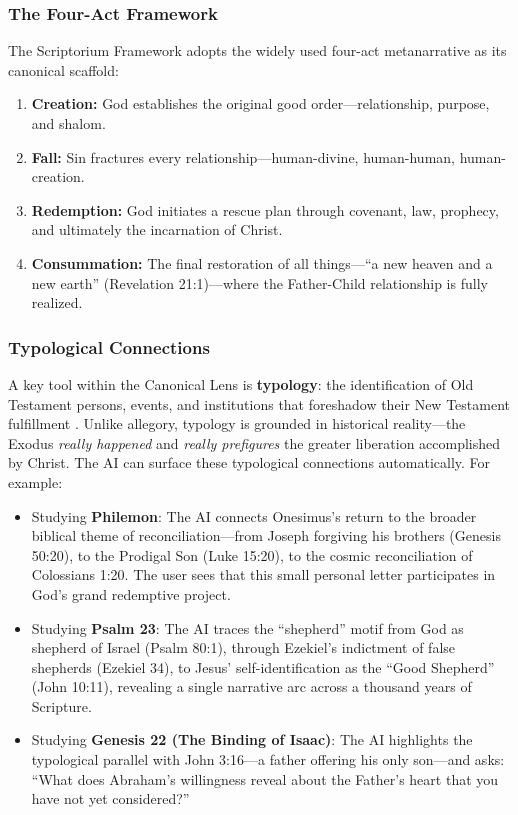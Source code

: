 \subsubsection{The Four-Act Framework}
The Scriptorium Framework adopts the widely used four-act metanarrative as its canonical scaffold:
\begin{enumerate}
    \item \textbf{Creation:} God establishes the original good order---relationship, purpose, and shalom.
    \item \textbf{Fall:} Sin fractures every relationship---human-divine, human-human, human-creation.
    \item \textbf{Redemption:} God initiates a rescue plan through covenant, law, prophecy, and ultimately the incarnation of Christ.
    \item \textbf{Consummation:} The final restoration of all things---``a new heaven and a new earth'' (Revelation 21:1)---where the Father-Child relationship is fully realized.
\end{enumerate}

\subsubsection{Typological Connections}
A key tool within the Canonical Lens is \textbf{typology}: the identification of Old Testament persons, events, and institutions that foreshadow their New Testament fulfillment \cite{beale2011}. Unlike allegory, typology is grounded in historical reality---the Exodus \textit{really happened} and \textit{really prefigures} the greater liberation accomplished by Christ. The AI can surface these typological connections automatically. For example:

\begin{itemize}
    \item Studying \textbf{Philemon}: The AI connects Onesimus's return to the broader biblical theme of reconciliation---from Joseph forgiving his brothers (Genesis 50:20), to the Prodigal Son (Luke 15:20), to the cosmic reconciliation of Colossians 1:20. The user sees that this small personal letter participates in God's grand redemptive project.
    \item Studying \textbf{Psalm 23}: The AI traces the ``shepherd'' motif from God as shepherd of Israel (Psalm 80:1), through Ezekiel's indictment of false shepherds (Ezekiel 34), to Jesus' self-identification as the ``Good Shepherd'' (John 10:11), revealing a single narrative arc across a thousand years of Scripture.
    \item Studying \textbf{Genesis 22 (The Binding of Isaac)}: The AI highlights the typological parallel with John 3:16---a father offering his only son---and asks: ``What does Abraham's willingness reveal about the Father's heart that you have not yet considered?''
\end{itemize}


